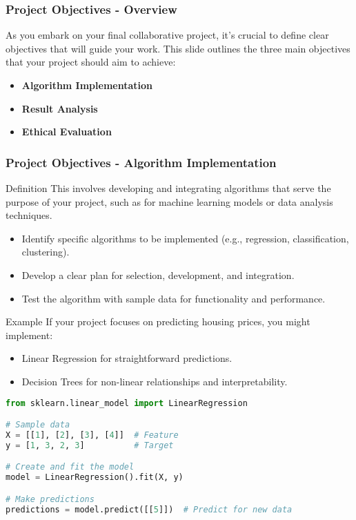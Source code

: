 \documentclass[aspectratio=169]{beamer}
\begin{document}
\begin{frame}[fragile]
    \frametitle{Project Objectives - Overview}
    As you embark on your final collaborative project, it's crucial to define clear objectives that will guide your work. This slide outlines the three main objectives that your project should aim to achieve:
    \begin{itemize}
        \item \textbf{Algorithm Implementation}
        \item \textbf{Result Analysis}
        \item \textbf{Ethical Evaluation}
    \end{itemize}
\end{frame}

\begin{frame}[fragile]
    \frametitle{Project Objectives - Algorithm Implementation}
    \begin{block}{Definition}
        This involves developing and integrating algorithms that serve the purpose of your project, such as for machine learning models or data analysis techniques.
    \end{block}
    
    \begin{itemize}
        \item Identify specific algorithms to be implemented (e.g., regression, classification, clustering).
        \item Develop a clear plan for selection, development, and integration.
        \item Test the algorithm with sample data for functionality and performance.
    \end{itemize}
    
    \begin{exampleblock}{Example}
        If your project focuses on predicting housing prices, you might implement:
        \begin{itemize}
            \item Linear Regression for straightforward predictions.
            \item Decision Trees for non-linear relationships and interpretability.
        \end{itemize}
    \end{exampleblock}
    
    \begin{lstlisting}[language=Python, caption=Linear Regression Implementation]
from sklearn.linear_model import LinearRegression

# Sample data
X = [[1], [2], [3], [4]]  # Feature
y = [1, 3, 2, 3]          # Target

# Create and fit the model
model = LinearRegression().fit(X, y)

# Make predictions
predictions = model.predict([[5]])  # Predict for new data
    \end{lstlisting}
\end{frame}
\end{document}
